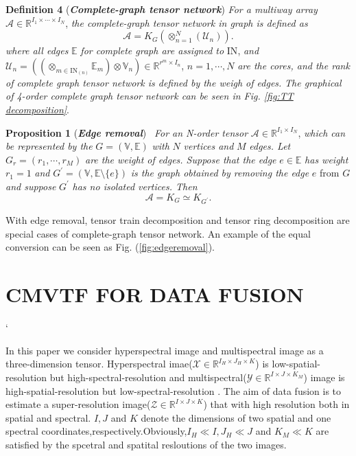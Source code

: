 \documentclass{article}
\begin{document}
\textbf{Definition 4} (\emph{\textbf{Complete-graph tensor network}})
\emph{For a multiway array} $\mathcal{A} \in \mathbb{R}^{I_{1} \times\cdots\times I_{N}}$, \emph{the complete-graph tensor network in graph is defined as}
\begin{equation}
\mathcal{A}=K_{G}(\otimes_{n=1}^{N}(\mathcal{U}_{n})\nonumber).
\end{equation}	
\emph{where all edges} $\mathbb{E}$ \emph{for complete graph are assigned to} $\text{IN}$, \emph{and} $\mathcal{U}_{n}=((\otimes_{m\in\text{IN}_{(n)}}\mathbb{E}_{m})\otimes\mathbb{V}_{n})\in\mathbb{R}^{r^{m}\times I_{n}}$,  $n=1, \cdots, N$ \emph{are the cores, and the rank of complete graph tensor network is defined by the weigh of edges.} \emph{The graphical of 4-order complete graph tensor network can be seen in Fig. \ref{fig:TT decomposition}}.

\textbf{Proposition 1} (\emph{\textbf{Edge removal}})~\cite{bibid} \emph{For an N-order tensor} $\mathcal{A}\in\mathbb{R}^{I_{1}\times I_{N}}$, \emph{which can be represented by the} 
$G=(\mathbb{V},\mathbb{E})$  \emph{with} $N$ \emph{vertices and} $M$ \emph{edges. Let} $G_{r}=(r_{1},\cdots,r_{M})$ \emph{are the weight of edges. Suppose that the edge} $e\in\mathbb{E}$\emph{ has weight} $r_{1}=1$ \emph{and} $G^{'}=(\mathbb{V},\mathbb{E}\setminus \{e\})$ \emph{is the graph obtained by removing the edge} $e$ from $G$ \emph{and suppose} $G^{'}$ \emph{has no isolated vertices. Then}
\begin{equation*}
\mathcal{A}=K_{G}\simeq K_{G^{'}}.
\end{equation*}

With edge removal, tensor train decomposition and tensor ring decomposition are special cases of complete-graph tensor network. An example of the equal conversion can be seen as Fig. (\ref{fig:edgeremoval}).

\section{CMVTF FOR DATA FUSION}
\label{sec:format}`

In this paper we consider hyperspectral image and multispectral image as a three-dimension tensor. Hyperspectral imae($\mathcal{X}\in \mathbb{R}^{I_H\times J_H\times  K} $) is low-spatial-resolution but high-spectral-resolution and multispectral($\mathcal{Y} \in \mathbb{R}^{I\times J\times  K_M} $) image is high-spatial-resolution but low-spectral-resolution . The aim of data fusion is to estimate a super-resolution image($\mathcal{Z} \in \mathbb{R}^{I\times J\times  K} $) that with high resolution both in spatial and spectral. $I,J$ and $K$ denote the dimensions of two spatial and one spectral coordinates,respectively.Obviously,$I_H \ll I , J_H \ll J $ and $K_M \ll K $ are satisfied by the spcetral and spatital resloutions of the two images.
\end{document}
